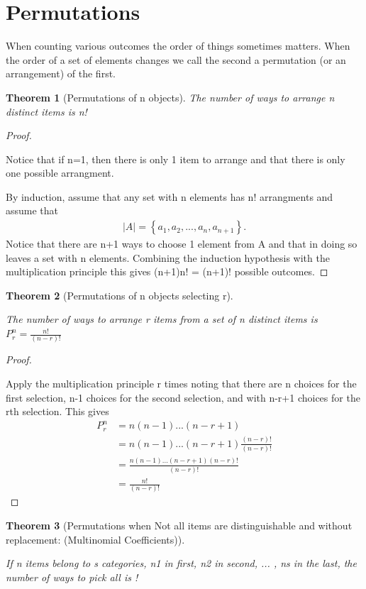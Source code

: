 \documentclass[10pt,]{book}
\theoremstyle{plain}
\newtheorem{theorem}{Theorem}[section]
\theoremstyle{definition}
\theoremstyle{definition}
\numberwithin{equation}{section}
\begin{document}
\section[Permutations]{Permutations}\label{section-10}
When counting various outcomes the order of things sometimes matters. When the order of a set of elements changes we call the second a permutation (or an arrangement) of the first.%
\begin{theorem}[Permutations of n objects]\label{theorem-9}
The number of ways to arrange n distinct items is n!\end{theorem}
\begin{proof}\hypertarget{proof-6}{}
Notice that if n=1, then there is only 1 item to arrange and 
			that there is only one possible arrangment.%
\par

			By induction, assume that any set with n elements has n! arrangments 
			and assume that 
			\begin{gather*}
|A| = \left \{ a_1, a_2, ... , a_n, a_{n+1} \right \}.
\end{gather*}
			Notice that there are n+1 ways to choose 1 element from A and that in doing so leaves a set with n elements. Combining the induction hypothesis with the multiplication principle this gives (n+1)n! = (n+1)! possible outcomes.
\end{proof}
\begin{theorem}[Permutations of n objects selecting r]\label{theorem-10}

			The number of ways to arrange r items from a set of n distinct items 
			is \( P_r^n = \frac{n!}{(n-r)!} \)
\end{theorem}
\begin{proof}\hypertarget{proof-7}{}

			Apply the multiplication principle r times noting that there are 
			n choices for the first selection, n-1 choices for the second
			selection, and with n-r+1 choices for the rth selection. This gives
			\begin{align*}
P_r^n & = n(n-1) ... (n-r+1)\\
& = n(n-1) ... (n-r+1)\frac{(n-r)!}{(n-r)!}\\
& = \frac{n(n-1) ... (n-r+1)(n-r)!}{(n-r)!}\\
& = \frac{n!}{(n-r)!}
\end{align*}
\end{proof}
\begin{theorem}[Permutations when Not all items are distinguishable and without replacement: (Multinomial Coefficients)]\label{theorem-11}

If n items belong to s categories, n1 in first, n2 in second, ... , ns in the last, the number of ways to pick all is
!	
	\end{theorem}
\typeout{************************************************}
\typeout{************************************************}
\end{document}
